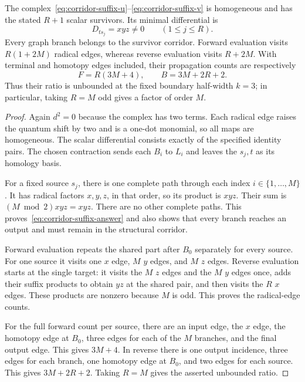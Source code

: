 \begin{theorem}\label{thm:corridor-separation}
The complex~\eqref{eq:corridor-suffix-u}--\eqref{eq:corridor-suffix-v} is
homogeneous and has the stated $R+1$ scalar survivors.  Its minimal
differential is
\begin{equation}\label{eq:corridor-suffix-answer}
 D_{t s_j}=xyz\ne0\qquad(1\le j\le R).
\end{equation}
Every graph branch belongs to the survivor corridor.  Forward evaluation
visits $R(1+2M)$ radical edges, whereas reverse evaluation visits $R+2M$.
With terminal and homotopy edges included, their propagation counts are
respectively
\begin{equation}\label{eq:corridor-suffix-counts}
 F=R(3M+4),\qquad B=3M+2R+2.
\end{equation}
Thus their ratio is unbounded at the fixed boundary half-width $k=3$;
in particular, taking $R=M$ odd gives a factor of order $M$.
\end{theorem}
\begin{proof}
Again $d^2=0$ because the complex has two terms.  Each radical edge raises
the quantum shift by two and is a one-dot monomial, so all maps are
homogeneous.  The scalar differential consists exactly of the specified
identity pairs.  The chosen contraction sends each $B_i$ to $L_i$ and leaves
the $s_j,t$ as its homology basis.

For a fixed source $s_j$, there is one complete path through each index
$i\in\{1,\ldots,M\}$.  It has radical factors $x,y,z$, in that order, so
its product is $xyz$.  Their sum is $(M\bmod2)xyz=xyz$.  There are no other
complete paths.  This proves~\eqref{eq:corridor-suffix-answer} and also shows
that every branch reaches an output and must remain in the structural
corridor.

Forward evaluation repeats the shared part after $B_0$ separately for every
source.  For one source it visits one $x$ edge, $M$ $y$ edges, and $M$ $z$
edges.  Reverse evaluation starts at the single target: it visits the $M$
$z$ edges and the $M$ $y$ edges once, adds their suffix products to obtain
$yz$ at the shared pair, and then visits the $R$ $x$ edges.  These products
are nonzero because $M$ is odd.  This proves the radical-edge counts.

For the full forward count per source, there are an input edge, the $x$
edge, the homotopy edge at $B_0$, three edges for each of the $M$ branches,
and the final output edge.  This gives $3M+4$.  In reverse there is one
output incidence, three edges for each branch, one homotopy edge at $B_0$,
and two edges for each source.  This gives $3M+2R+2$.  Taking $R=M$ gives
the asserted unbounded ratio.
\end{proof}

